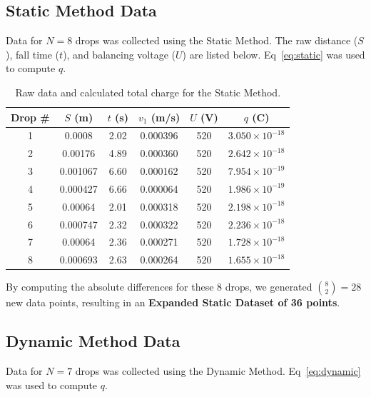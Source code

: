 \documentclass[a4paper,11pt]{article}
\begin{document}
\subsection{Static Method Data}
Data for $N=8$ drops was collected using the Static Method. The raw distance ($S$), fall time ($t$), and balancing voltage ($U$) are listed below. Eq~\ref{eq:static} was used to compute $q$.

\begin{table}[H]
\centering
\caption{Raw data and calculated total charge for the Static Method.}
\label{tab:static}
\begin{tabular}{c S[table-format=1.6] S[table-format=1.2] S[table-format=1.6] S[table-format=3.0] c}
\toprule
{Drop \#} & {$S$ (m)} & {$t$ (s)} & {$v_1$ (m/s)} & {$U$ (V)} & {$q$ (C)} \\
 & 0.0008 & 2.02 & 0.000396 & 520 & $3.050 \times 10^{-18}$ \\
2 & 0.00176 & 4.89 & 0.000360 & 520 & $2.642 \times 10^{-18}$ \\
3 & 0.001067 & 6.60 & 0.000162 & 520 & $7.954 \times 10^{-19}$ \\
4 & 0.000427 & 6.66 & 0.000064 & 520 & $1.986 \times 10^{-19}$ \\
5 & 0.00064 & 2.01 & 0.000318 & 520 & $2.198 \times 10^{-18}$ \\
6 & 0.000747 & 2.32 & 0.000322 & 520 & $2.236 \times 10^{-18}$ \\
7 & 0.00064 & 2.36 & 0.000271 & 520 & $1.728 \times 10^{-18}$ \\
8 & 0.000693 & 2.63 & 0.000264 & 520 & $1.655 \times 10^{-18}$ \\
\bottomrule
\end{tabular}
\end{table}

By computing the absolute differences for these 8 drops, we generated $\binom{8}{2} = 28$ new data points, resulting in an \textbf{Expanded Static Dataset of 36 points}.

\subsection{Dynamic Method Data}
Data for $N=7$ drops was collected using the Dynamic Method. Eq~\ref{eq:dynamic} was used to compute $q$.
\end{document}
